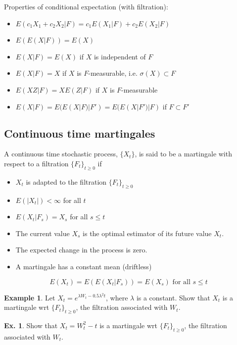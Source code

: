 \documentclass[11pt,a4paper]{book}
\theoremstyle{definition}\newtheorem{definition}{Definition}
\theoremstyle{definition}\newtheorem{fact}{Fact}
\theoremstyle{definition}\newtheorem{remark}{Remark}
\theoremstyle{definition}\newtheorem{ex}{Ex.}
\theoremstyle{definition}\newtheorem{project}{Project}
\theoremstyle{definition}\newtheorem{problem}{Problem}
\theoremstyle{definition}\newtheorem{example}{Example}
\numberwithin{theorem}{section}
\numberwithin{corollary}{chapter}
\numberwithin{assumption}{chapter}
\numberwithin{definition}{chapter}
\numberwithin{prop}{chapter}
\numberwithin{notation}{chapter}
\numberwithin{problem}{chapter}
\numberwithin{example}{chapter}
\numberwithin{fact}{chapter}
\numberwithin{ex}{chapter}
\begin{document}
Properties of conditional expectation (with filtration):
\begin{itemize}
\item $E(c_1X_1 + c_2X_2 | F) = c_1 E(X_1 | F) + c_2 E(X_2 | F)$
\item $E( E(X|F) ) = E(X)$
\item $E(X|F) = E(X)$ if $X$ is independent of $F$
\item $E(X|F) = X$ if $X$ is $F$-measurable, i.e. $\sigma(X) \subset F$
\item $E(XZ|F) = XE(Z|F)$ if $X$ is $F$-measurable
\item $E(X|F) = E(E(X|F)|F') = E(E(X|F')|F)$ if $F \subset F'$
\end{itemize}

\subsection{Continuous time martingales}
A continuous time stochastic process, $\{X_t\}$, is said to be a martingale with respect to a filtration $\{F_t\}_{t\geq 0}$ if
\begin{itemize}
\item $X_t$ is adapted to the filtration $\{F_t\}_{t\geq 0}$
\item $E(|X_t|) < \infty$ for all $t$
\item $E(X_t | F_s) = X_s$ for all $s \leq t$
\end{itemize}

\begin{itemize}[label={$\Rightarrow$}]
\item The current value $X_s$ is the optimal estimator of its future value $X_t$. 
\item The expected change in the process is zero.
\item A martingale has a constant mean (driftless)
\end{itemize}
$$E(X_t) = E(E(X_t | F_s)) = E(X_s) \text{ for all } s \leq t$$
\begin{example}
Let $X_t = e^{\lambda W_t - 0.5 \lambda^2 t}$, where $\lambda$ is a constant. Show that $X_t$ is a martingale wrt $\{F_t\}_{t\geq 0}$, the filtration associated with $W_t$.
\end{example}

\begin{ex}
Show that $X_t = W_t^2 - t$ is a martingale wrt $\{F_t\}_{t\geq 0}$, the filtration associated with $W_t$.
\end{ex}
\end{document}
